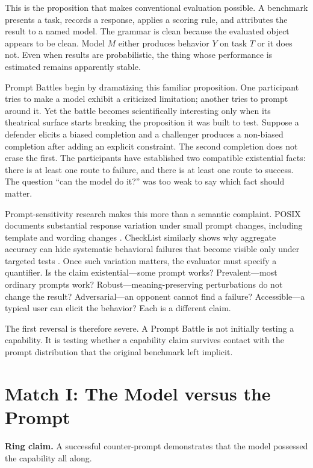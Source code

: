 \documentclass[11pt]{article}
\newcommand{\ringclaim}[1]{\vspace{0.35em}\noindent\textbf{Ring claim.} #1\vspace{0.15em}}
\begin{document}
This is the proposition that makes conventional evaluation possible. A benchmark presents a task, records a response, applies a scoring rule, and attributes the result to a named model. The grammar is clean because the evaluated object appears to be clean. Model $M$ either produces behavior $Y$ on task $T$ or it does not. Even when results are probabilistic, the thing whose performance is estimated remains apparently stable.

Prompt Battles begin by dramatizing this familiar proposition. One participant tries to make a model exhibit a criticized limitation; another tries to prompt around it. Yet the battle becomes scientifically interesting only when its theatrical surface starts breaking the proposition it was built to test. Suppose a defender elicits a biased completion and a challenger produces a non-biased completion after adding an explicit constraint. The second completion does not erase the first. The participants have established two compatible existential facts: there is at least one route to failure, and there is at least one route to success. The question ``can the model do it?'' was too weak to say which fact should matter.

Prompt-sensitivity research makes this more than a semantic complaint. POSIX documents substantial response variation under small prompt changes, including template and wording changes \cite{chatterjee2024posix}. CheckList similarly shows why aggregate accuracy can hide systematic behavioral failures that become visible only under targeted tests \cite{ribeiro2020beyond}. Once such variation matters, the evaluator must specify a quantifier. Is the claim existential---some prompt works? Prevalent---most ordinary prompts work? Robust---meaning-preserving perturbations do not change the result? Adversarial---an opponent cannot find a failure? Accessible---a typical user can elicit the behavior? Each is a different claim.

The first reversal is therefore severe. A Prompt Battle is not initially testing a capability. It is testing whether a capability claim survives contact with the prompt distribution that the original benchmark left implicit.

\section{Match I: The Model versus the Prompt}
\ringclaim{A successful counter-prompt demonstrates that the model possessed the capability all along.}
\end{document}
